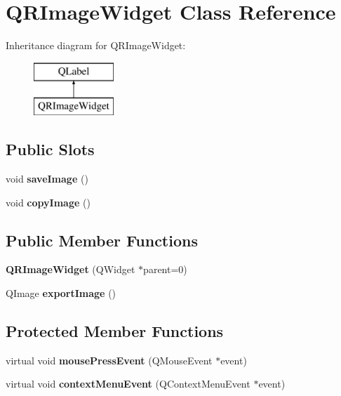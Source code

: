 \hypertarget{class_q_r_image_widget}{}\section{Q\+R\+Image\+Widget Class Reference}
\label{class_q_r_image_widget}
Inheritance diagram for Q\+R\+Image\+Widget\+:\begin{figure}[H]
\begin{center}
\leavevmode
\includegraphics[height=2.000000cm]{class_q_r_image_widget}
\end{center}
\end{figure}
\subsection*{Public Slots}
\begin{DoxyCompactItemize}
\item 
\mbox{\label{class_q_r_image_widget_a957f368bcd679206f0376931d4a58182}} 
void {\bfseries save\+Image} ()
\item 
\mbox{\label{class_q_r_image_widget_a3f10674c50e33d9feb360f5594610d57}} 
void {\bfseries copy\+Image} ()
\end{DoxyCompactItemize}
\subsection*{Public Member Functions}
\begin{DoxyCompactItemize}
\item 
\mbox{\label{class_q_r_image_widget_a6e4e5dbe06f17431e053d484e1f54ba9}} 
{\bfseries Q\+R\+Image\+Widget} (Q\+Widget $\ast$parent=0)
\item 
\mbox{\label{class_q_r_image_widget_a717edd656c51439324a2d73e1ac694ad}} 
Q\+Image {\bfseries export\+Image} ()
\end{DoxyCompactItemize}
\subsection*{Protected Member Functions}
\begin{DoxyCompactItemize}
\item 
\mbox{\label{class_q_r_image_widget_a41a9934596093eab1fa6c1d67cab52a7}} 
virtual void {\bfseries mouse\+Press\+Event} (Q\+Mouse\+Event $\ast$event)
\item 
\mbox{\label{class_q_r_image_widget_a82c9b3196dcc5170466078948edbcde3}} 
virtual void {\bfseries context\+Menu\+Event} (Q\+Context\+Menu\+Event $\ast$event)
\end{DoxyCompactItemize}


